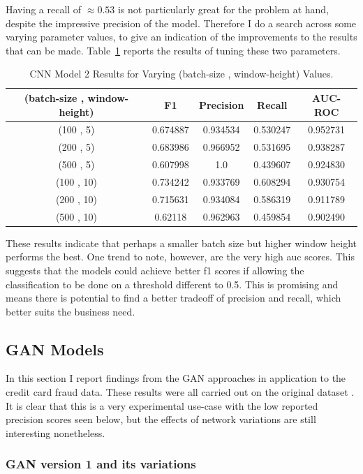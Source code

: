 \documentclass[12pt,a4paper,twoside]{report}
\begin{document}
Having a recall of $ \approx0.53 $ is not particularly great for the problem at hand, despite the impressive precision of the model. Therefore I do a search across some varying parameter values, to give an indication of the improvements to the results that can be made. Table~\ref{table:cnnv2-results-tuning} reports the results of tuning these two parameters.

\begin{table}[H]  
  \centering
  \begin{tabular}{ccccc}
    \toprule
     (batch-size , window-height) & F1 & Precision & Recall & AUC-ROC \\ \midrule
    (100 , 5) & 0.674887 & 0.934534 & 0.530247 & 0.952731  \\
    (200 , 5) & 0.683986 & 0.966952 & 0.531695 & 0.938287 \\
    (500 , 5) & 0.607998 &1.0 & 0.439607 & 0.924830 \\
    (100 , 10) & 0.734242 & 0.933769 & 0.608294 & 0.930754 \\
    (200 , 10) & 0.715631 & 0.934084 & 0.586319 & 0.911789 \\
    (500 , 10) & 0.62118 & 0.962963 & 0.459854 & 0.902490\\
   \bottomrule
 \end{tabular}
 \caption{CNN Model 2 Results for Varying (batch-size , window-height) Values.}
\label{table:cnnv2-results-tuning}
\end{table}

These results indicate that perhaps a smaller batch size but higher window height performs the best. One trend to note, however, are the very high auc scores. This suggests that the models could achieve better f1 scores if allowing the classification to be done on a threshold different to 0.5. This is promising and means there is potential to find a better tradeoff of precision and recall, which better suits the business need.

\subsection{GAN Models}
In this section I report findings from the GAN approaches in application to the credit card fraud data. These results were all carried out on the original dataset . It is clear that this is a very experimental use-case with the low reported precision scores seen below, but the effects of network variations are still interesting nonetheless.

\subsubsection{GAN version 1 and its variations}
\end{document}
